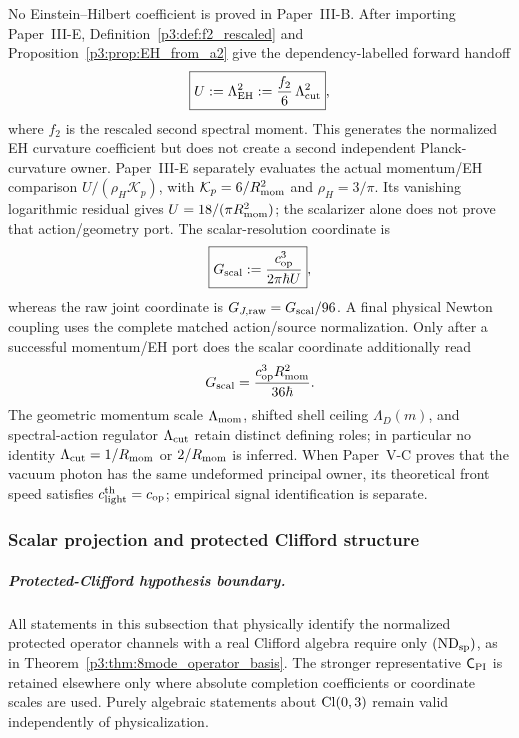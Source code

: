 \documentclass[12pt,a4paper]{article}
\begin{document}
\begin{remark}
\label{p3:rem:forward-EH-cutoff-handoff}
No Einstein--Hilbert coefficient is proved in Paper~III-B.  After importing
Paper~III-E, Definition~\ref{p3:def:f2_rescaled} and
Proposition~\ref{p3:prop:EH_from_a2} give the dependency-labelled forward
handoff
\begin{equation}
 \boxed{U:=\Lambda_{\rm EH}^2:=\frac{f_2}{6}\,\Lambda_{\mathrm{cut}}^2},
\label{p3:eq:Lambda_EH_def_forward}
\end{equation}
where \(f_2\) is the rescaled second spectral moment.  This generates the
normalized EH curvature coefficient but does not create a second independent
Planck-curvature owner. Paper~III-E separately evaluates the actual
momentum/EH comparison $U/(\rho_H\mathcal K_p)$, with
$\mathcal K_p=6/R_{\mathrm{mom}}^2$ and $\rho_H=3/\pi$. Its vanishing logarithmic
residual gives $U=18/(\pi R_{\mathrm{mom}}^2)$; the scalarizer alone does not prove
that action/geometry port. The scalar-resolution coordinate is
\begin{equation}
 \boxed{G_{\rm scal}:=\frac{c_{\rm op}^3}{2\pi\hbar U}},
\label{p3:eq:Rp_EH_normalization}
\end{equation}
whereas the raw joint coordinate is $G_{J,\rm raw}=G_{\rm scal}/96$.
A final physical Newton coupling uses the complete matched action/source
normalization. Only after a successful momentum/EH port does the scalar
coordinate additionally read
\[
 G_{\rm scal}=\frac{c_{\rm op}^3R_{\mathrm{mom}}^2}{36\hbar}.
\]  The geometric momentum scale
\(\Lambda_{\rm mom}\), shifted shell ceiling \(\Lambda_D(m)\), and
spectral-action regulator \(\Lambda_{\mathrm{cut}}\) retain distinct defining roles; in
particular no identity \(\Lambda_{\mathrm{cut}}=1/R_{\mathrm{mom}}\) or \(2/R_{\mathrm{mom}}\) is inferred.  When
Paper~V-C proves that the vacuum photon has the same undeformed principal owner,
its theoretical front speed satisfies \(c_{\rm light}^{\rm th}=c_{\rm op}\);
empirical signal identification is separate.
\end{remark}


\subsubsection{Scalar projection and protected Clifford structure}
\label{p3:sec:factor_one_eighth}

\subparagraph{Protected-Clifford hypothesis boundary.}
All statements in this subsection that physically identify the normalized
protected operator channels with a real Clifford algebra require only
\((\mathrm{ND}_{\rm sp})\), as in
Theorem~\ref{p3:thm:8mode_operator_basis}.  The stronger representative
\(\mathsf C_{\rm PI}\) is retained elsewhere only where absolute completion
coefficients or coordinate scales are used.  Purely algebraic statements
about \(\operatorname{Cl}(0,3)\) remain valid independently of physicalization.
\end{document}
